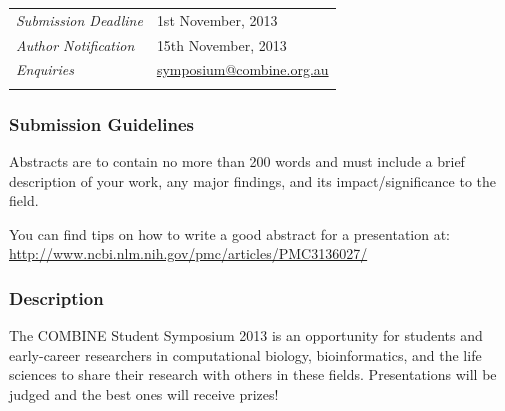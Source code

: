 \documentclass[12pt,]{article}
\begin{document}
\begin{longtable}[c]{@{}ll@{}}
\begin{minipage}[t]{0.30\columnwidth}\raggedright
\emph{Submission Deadline}
\end{minipage} & \begin{minipage}[t]{0.70\columnwidth}\raggedright
    1st November, 2013
\end{minipage}
\\\noalign{\medskip}

\begin{minipage}[t]{0.30\columnwidth}\raggedright
\emph{Author Notification}
\end{minipage} & \begin{minipage}[t]{0.70\columnwidth}\raggedright
    15th November, 2013
\end{minipage}
\\\noalign{\medskip}

\begin{minipage}[t]{0.30\columnwidth}\raggedright
\emph{Enquiries}
\end{minipage} & \begin{minipage}[t]{0.70\columnwidth}\raggedright
\href{mailto:symposium@combine.org.au}{symposium@combine.org.au}
\end{minipage}
\\\noalign{\medskip}
\hline
\end{longtable}

\subsubsection{Submission Guidelines}

    Abstracts are to contain no more than 200 words and must
    include a brief description of your work, any major findings,
    and its impact/significance to the field.

    You can find tips on how to write a good abstract for a presentation at: \href{http://www.ncbi.nlm.nih.gov/pmc/articles/PMC3136027/}{http://www.ncbi.nlm.nih.gov/pmc/articles/PMC3136027/}

\subsubsection{Description}

The COMBINE Student Symposium 2013 is an opportunity for students and
early-career researchers in computational biology, bioinformatics, and the life
sciences to share their research with others in these fields. Presentations
will be judged and the best ones will receive prizes!
\end{document}
